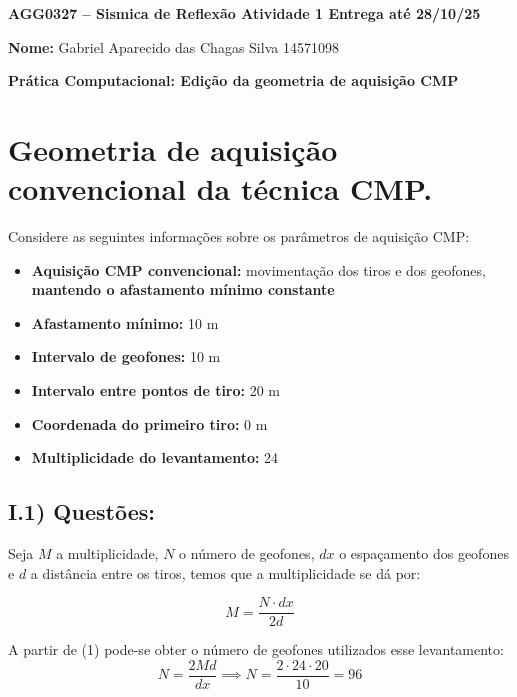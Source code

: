 \documentclass[12pt,a4paper]{article}
\begin{document}
\thispagestyle{fancy}

\begin{center}
    \textbf{AGG0327 – Sismica de Reflexão \hfill Atividade 1 \hfill Entrega até 28/10/25}
\end{center}

\vspace{0.3cm} %

\textbf{Nome:} Gabriel Aparecido das Chagas Silva 14571098

\vspace{0.3cm} %

\begin{center}
    \textbf{Prática Computacional: Edição da geometria de aquisição CMP}
\end{center}


\section{Geometria de aquisição convencional da técnica CMP.}

Considere as seguintes informações sobre os parâmetros de aquisição CMP:
\begin{itemize}[leftmargin=2cm]
    \item \textbf{Aquisição CMP convencional:} movimentação dos tiros e dos geofones, \textbf{mantendo o afastamento mínimo constante}
    \item \textbf{Afastamento mínimo:} 10 m
    \item \textbf{Intervalo de geofones:} 10 m
    \item \textbf{Intervalo entre pontos de tiro:} 20 m
    \item \textbf{Coordenada do primeiro tiro:} 0 m
    \item \textbf{Multiplicidade do levantamento:} 24
\end{itemize}

\subsection{I.1) Questões:}


Seja $M$ a multiplicidade, $N$ o número de geofones, $dx$ o espaçamento dos geofones e $d$ a distância entre os tiros, temos que a multiplicidade se dá por:

\begin{equation}
    M = \frac{N\cdot dx}{2d}
\end{equation}


A partir de (1) pode-se obter o número de geofones utilizados esse levantamento: $$N = \frac{2Md}{dx} \implies N =\frac{ 2\cdot 24 \cdot 20}{10} = 96$$
\end{document}
